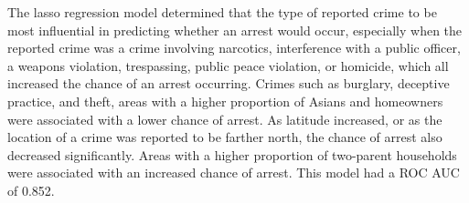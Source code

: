 \documentclass{ucetd}
\begin{document}
The lasso regression model determined that the type of reported crime to
be most influential in predicting whether an arrest would occur,
especially when the reported crime was a crime involving narcotics,
interference with a public officer, a weapons violation, trespassing,
public peace violation, or homicide, which all increased the chance of
an arrest occurring. Crimes such as burglary, deceptive practice, and
theft, areas with a higher proportion of Asians and homeowners were
associated with a lower chance of arrest. As latitude increased, or as
the location of a crime was reported to be farther north, the chance of
arrest also decreased significantly. Areas with a higher proportion of
two-parent households were associated with an increased chance of
arrest. This model had a ROC AUC of 0.852.

\begin{table}


\end{table}
\end{document}
